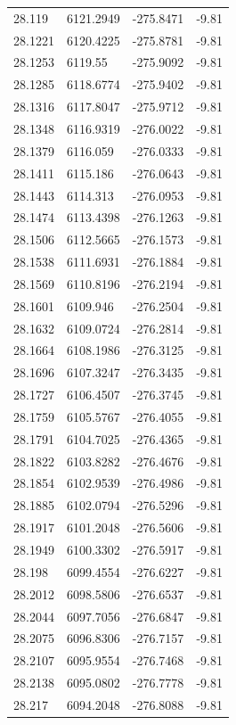 \begin{table}[H]
\begin{tabular}{llll}
28.119 & 6121.2949 & -275.8471 & -9.81 \\
28.1221 & 6120.4225 & -275.8781 & -9.81 \\
28.1253 & 6119.55 & -275.9092 & -9.81 \\
28.1285 & 6118.6774 & -275.9402 & -9.81 \\
28.1316 & 6117.8047 & -275.9712 & -9.81 \\
28.1348 & 6116.9319 & -276.0022 & -9.81 \\
28.1379 & 6116.059 & -276.0333 & -9.81 \\
28.1411 & 6115.186 & -276.0643 & -9.81 \\
28.1443 & 6114.313 & -276.0953 & -9.81 \\
28.1474 & 6113.4398 & -276.1263 & -9.81 \\
28.1506 & 6112.5665 & -276.1573 & -9.81 \\
28.1538 & 6111.6931 & -276.1884 & -9.81 \\
28.1569 & 6110.8196 & -276.2194 & -9.81 \\
28.1601 & 6109.946 & -276.2504 & -9.81 \\
28.1632 & 6109.0724 & -276.2814 & -9.81 \\
28.1664 & 6108.1986 & -276.3125 & -9.81 \\
28.1696 & 6107.3247 & -276.3435 & -9.81 \\
28.1727 & 6106.4507 & -276.3745 & -9.81 \\
28.1759 & 6105.5767 & -276.4055 & -9.81 \\
28.1791 & 6104.7025 & -276.4365 & -9.81 \\
28.1822 & 6103.8282 & -276.4676 & -9.81 \\
28.1854 & 6102.9539 & -276.4986 & -9.81 \\
28.1885 & 6102.0794 & -276.5296 & -9.81 \\
28.1917 & 6101.2048 & -276.5606 & -9.81 \\
28.1949 & 6100.3302 & -276.5917 & -9.81 \\
28.198 & 6099.4554 & -276.6227 & -9.81 \\
28.2012 & 6098.5806 & -276.6537 & -9.81 \\
28.2044 & 6097.7056 & -276.6847 & -9.81 \\
28.2075 & 6096.8306 & -276.7157 & -9.81 \\
28.2107 & 6095.9554 & -276.7468 & -9.81 \\
28.2138 & 6095.0802 & -276.7778 & -9.81 \\
28.217 & 6094.2048 & -276.8088 & -9.81 \\

\end{tabular}
\end{table}
